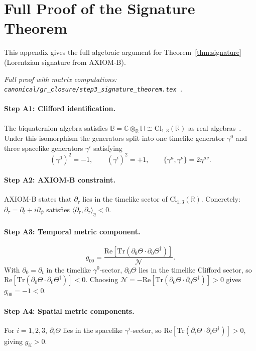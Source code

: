 \documentclass[12pt,a4paper]{article}
\theoremstyle{definition}
\theoremstyle{remark}
\newcommand{\BB}{\mathbb{B}}
\newcommand{\CC}{\mathbb{C}}
\newcommand{\RR}{\mathbb{R}}
\newcommand{\HH}{\mathbb{H}}
\newcommand{\Tr}{\mathrm{Tr}}
\newcommand{\re}{\mathrm{Re}}
\newcommand{\calN}{\mathcal{N}}
\begin{document}
\section{Full Proof of the Signature Theorem}
\label{app:signature}

This appendix gives the full algebraic argument for
Theorem~\ref{thm:signature} (Lorentzian signature from AXIOM-B).

\medskip
\noindent\textit{Full proof with matrix computations:
\texttt{canonical/gr\_closure/step3\_signature\_theorem.tex}~\cite{jaros2026_canonical}.}

\paragraph{Step A1: Clifford identification.}
The biquaternion algebra satisfies
$\BB = \CC\otimes_\RR\HH \cong \mathrm{Cl}_{1,3}(\RR)$
as real algebras~\cite{porteous1995}.
Under this isomorphism the generators split into one timelike generator
$\gamma^0$ and three spacelike generators $\gamma^i$ satisfying
\[
  (\gamma^0)^2 = -1, \qquad
  (\gamma^i)^2 = +1, \qquad
  \{\gamma^\mu,\gamma^\nu\} = 2\eta^{\mu\nu}.
\]

\paragraph{Step A2: AXIOM-B constraint.}
AXIOM-B states that $\partial_\tau$ lies in the timelike sector of
$\mathrm{Cl}_{1,3}(\RR)$.
Concretely: $\partial_\tau = \partial_t + i\partial_\psi$ satisfies
$\langle\partial_\tau,\partial_\tau\rangle_\eta < 0$.

\paragraph{Step A3: Temporal metric component.}
\[
  g_{00}
  = \frac{\re[\Tr(\partial_0\Theta \cdot \partial_0\Theta^\dagger)]}{\calN}.
\]
With $\partial_0 = \partial_t$ in the timelike $\gamma^0$-sector,
$\partial_0\Theta$ lies in the timelike Clifford sector, so
$\re[\Tr(\partial_0\Theta \cdot \partial_0\Theta^\dagger)] < 0$.
Choosing $\calN = -\re[\Tr(\partial_0\Theta \cdot \partial_0\Theta^\dagger)] > 0$
gives $g_{00} = -1 < 0$.

\paragraph{Step A4: Spatial metric components.}
For $i = 1,2,3$, $\partial_i\Theta$ lies in the spacelike $\gamma^i$-sector,
so $\re[\Tr(\partial_i\Theta \cdot \partial_i\Theta^\dagger)] > 0$,
giving $g_{ii} > 0$.
\end{document}
